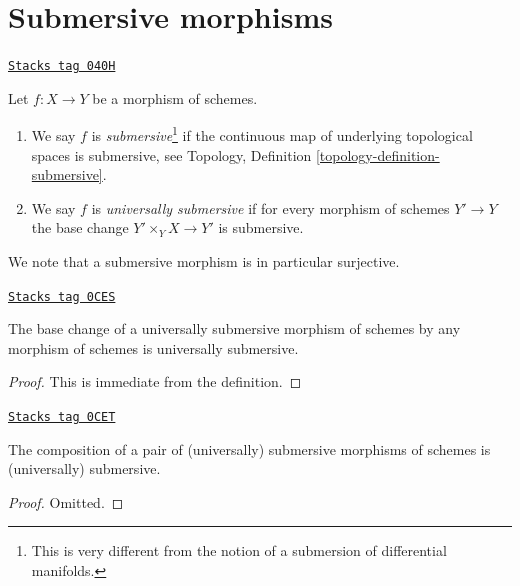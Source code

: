 \section{Submersive morphisms}
\label{morphisms-section-submersive}
\begin{definition}[Submersive]
\label{morphisms-definition-submersive}
\href{https://stacks.math.columbia.edu/tag/040H}{\texttt{Stacks tag 040H}}

Let $f : X \to Y$ be a morphism of schemes.
\begin{enumerate}
\item We say $f$ is {\it submersive}\footnote{This is very different
from the notion of a submersion of differential manifolds.}
if the continuous map of underlying topological spaces is submersive, see
Topology, Definition \ref{topology-definition-submersive}.
\item We say $f$ is {\it universally submersive} if for every
morphism of schemes $Y' \to Y$ the base change
$Y' \times_Y X \to Y'$ is submersive.
\end{enumerate}
\end{definition}

We note that a submersive morphism is in particular surjective.

\begin{lemma}
\label{morphisms-lemma-base-change-universally-submersive}
\href{https://stacks.math.columbia.edu/tag/0CES}{\texttt{Stacks tag 0CES}}

The base change of a universally submersive morphism of schemes
by any morphism of schemes is universally submersive.
\end{lemma}

\begin{proof}
This is immediate from the definition.
\end{proof}

\begin{lemma}
\label{morphisms-lemma-composition-universally-submersive}
\href{https://stacks.math.columbia.edu/tag/0CET}{\texttt{Stacks tag 0CET}}

The composition of a pair of (universally) submersive morphisms of
schemes is (universally) submersive.
\end{lemma}

\begin{proof}
Omitted.
\end{proof}

